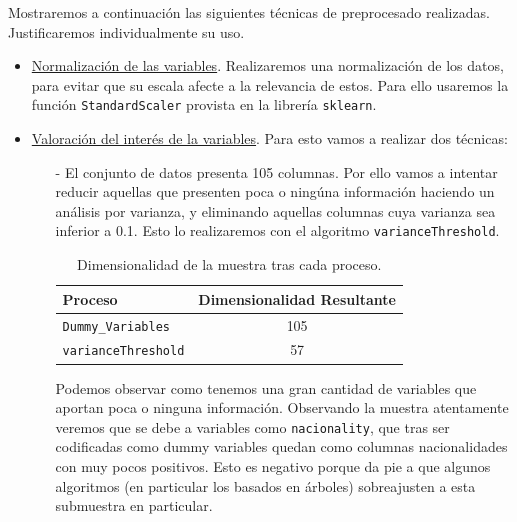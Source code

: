 \documentclass[11pt,a4paper]{article}
\begin{document}
Mostraremos a continuación las siguientes técnicas de preprocesado realizadas. Justificaremos individualmente su uso.

\begin{itemize}

	\item \underline{Normalización de las variables}. Realizaremos una normalización de los datos, para evitar que su escala afecte a la relevancia de estos. Para ello usaremos la función \texttt{StandardScaler}\cite{standardscaler} provista en la librería \texttt{sklearn}.
		\item \underline{Valoración del interés de la variables}. Para esto vamos a realizar dos técnicas:
	
	\begin{itemize}
	\item[-] El conjunto de datos presenta 105 columnas. Por ello vamos a intentar reducir aquellas que presenten poca o ningúna información haciendo un análisis por varianza, y eliminando aquellas columnas cuya varianza sea inferior a 0.1. Esto lo realizaremos con el algoritmo \texttt{varianceThreshold}\cite{einstein}.
			
\begin{table}[h]
\begin{center}
\begin{tabular}{|l|c|}
\hline
 Proceso & Dimensionalidad Resultante \\ \hline
 \texttt{Dummy\_Variables} &  105\\
\texttt{varianceThreshold} &57 \\\hline
\end{tabular}
\end{center}
\caption{Dimensionalidad de la muestra tras cada proceso.}
	\end{table}



Podemos observar como tenemos una gran cantidad de variables que aportan poca o ninguna información. Observando la muestra atentamente veremos que se debe a variables como \texttt{nacionality}, que tras ser codificadas como dummy variables quedan como columnas nacionalidades con muy pocos positivos. Esto es negativo porque da pie a que algunos algoritmos (en particular los basados en árboles) sobreajusten a esta submuestra en particular. \\


\end{itemize}
\end{itemize}
\end{document}

